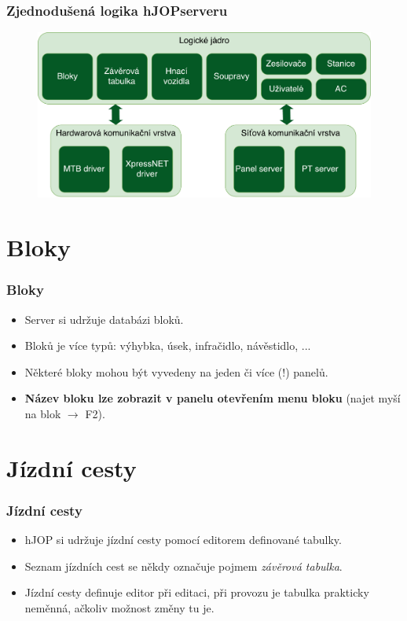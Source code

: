 \documentclass[czech]{beamer}
\begin{document}

\begin{frame}
\frametitle{Zjednodušená logika hJOPserveru}
\begin{figure}
\includegraphics[width=\linewidth]{hJOPserver-log-scheme.pdf}
\end{figure}
\end{frame}

\section{Bloky}

\begin{frame}
\frametitle{Bloky}
\begin{itemize}
\item Server si udržuje databázi bloků.
\item Bloků je více typů: výhybka, úsek, infračidlo, návěstidlo, ...
\item Některé bloky mohou být vyvedeny na jeden či více (!) panelů.
\item \textbf{Název bloku lze zobrazit v panelu otevřením menu bloku}
(najet myší na blok $\rightarrow$ F2).
\end{itemize}
\end{frame}

\section{Jízdní cesty}

\begin{frame}
\frametitle{Jízdní cesty}
\begin{itemize}
\item hJOP si udržuje jízdní cesty pomocí editorem definované tabulky.
\item Seznam jízdních cest se někdy označuje pojmem \textit{závěrová tabulka}.
\item Jízdní cesty definuje editor při editaci, při provozu je tabulka prakticky
	neměnná, ačkoliv možnost změny tu je.
\end{itemize}
\end{frame}
\end{document}
